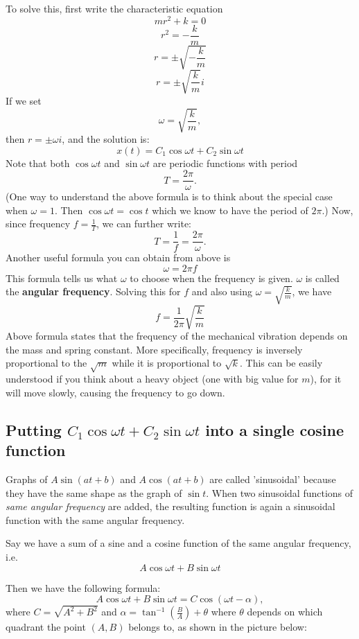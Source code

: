 \documentclass[12pt]{report}
\begin{document}
To solve this, first write the characteristic equation
$$m r^2 +k =0 $$
$$r^2 = -\frac{k}{m}$$
$$r = \pm \sqrt{-\frac{k}{m}}$$
$$ r = \pm \sqrt{\frac{k}{m}}i$$
If we set
$$\omega = \sqrt{\frac{k}{m}},$$
then $r = \pm \omega i $, and the solution is:
$$x(t) = C_1 \cos \omega t + C_2 \sin \omega t$$
Note that both $\cos \omega t$ and $\sin \omega t$ are periodic functions with period
$$T = \frac{2\pi}{\omega}.$$
(One way to understand the above formula is to think about the special case when $\omega=1$. Then $\cos \omega t = \cos t$ which we know to have the period of $2\pi$.)
Now, since frequency $f=\frac{1}{T}$, we can further write:
$$T=\frac{1}{f}=\frac{2\pi}{\omega}.$$
Another useful formula you can obtain from above is
$$\omega = 2\pi f$$
This formula tells us what $\omega$ to choose when the frequency is given. $\omega$ is called the \textbf{angular frequency}. Solving this for $f$ and also using $\omega = \sqrt{\frac{k}{m}}$, we have
$$f = \frac{1}{2\pi} \sqrt{\frac{k}{m}}$$
Above formula states that the frequency of the mechanical vibration depends on the mass and spring constant. More specifically, frequency is inversely proportional to the $\sqrt{m}$ while it is proportional to $\sqrt{k}$. This can be easily understood if you think about a heavy object (one with big value for $m$), for it will move slowly, causing the frequency to go down.

\subsection*{Putting $C_1 \cos \omega t + C_2 \sin \omega t$ into a single cosine function}

Graphs of $A\sin (at+b)$ and $A\cos (at+b)$ are called 'sinusoidal' because they have the same shape as the graph of $\sin t$. When two sinusoidal functions of \textit{same angular frequency} are added, the resulting function is again a sinusoidal function with the same angular frequency.

Say we have a sum of a sine and a cosine function of the same angular frequency, i.e.
$$A \cos \omega t + B\sin \omega t$$

Then we have the following formula:
$$A \cos \omega t + B\sin \omega t = C \cos (\omega t -\alpha),$$
where $C = \sqrt{A^2 + B^2} $ and $\alpha = \tan^{-1} \left(\frac{B}{A}\right) + \theta$ where $\theta$ depends on which quadrant the point $(A,B)$ belongs to, as shown in the picture below:

\begin{center}
\end{center}
\end{document}
